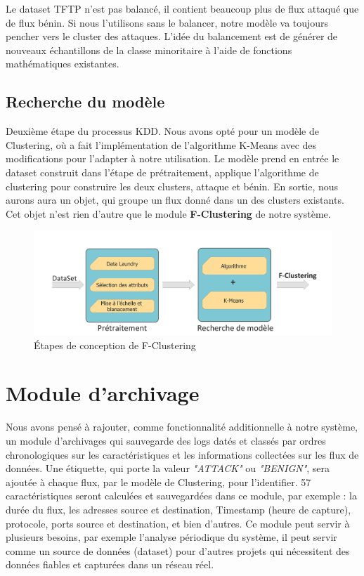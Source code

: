 Le dataset TFTP n'est pas balancé, il contient beaucoup plus de flux attaqué que de flux bénin. Si nous l'utilisons sans le balancer, notre modèle va toujours pencher vers le cluster des attaques. L'idée du balancement est de générer de nouveaux échantillons de la classe minoritaire à l'aide de fonctions mathématiques existantes.

\subsection{Recherche du modèle}
Deuxième étape du processus KDD. Nous avons opté pour un modèle de Clustering, où a fait l'implémentation de l'algorithme K-Means avec des modifications pour l'adapter à notre utilisation. Le modèle prend en entrée le dataset construit dans l'étape de prétraitement, applique l'algorithme de clustering pour construire les deux clusters, attaque et bénin. En sortie, nous aurons aura un objet, qui groupe un flux donné dans un des clusters existants. Cet objet n'est rien d'autre que le module \textbf{F-Clustering} de notre système.
\begin{figure}[h]
\centering
\includegraphics[width=\textwidth]{Figures/Diagramme2}
\decoRule
\caption{Étapes de conception de F-Clustering}
\label{fig:F-Clustering_Diagramme}
\end{figure} 

\section{Module d'archivage}
Nous avons pensé à rajouter, comme fonctionnalité additionnelle à notre système, un module d’archivages qui sauvegarde des logs datés et classés par ordres chronologiques sur les caractéristiques et les informations collectées sur les flux de données.  Une étiquette, qui porte la valeur \textit{"ATTACK"} ou \textit{"BENIGN"}, sera ajoutée à chaque flux, par le modèle de Clustering, pour l'identifier. 57 caractéristiques seront calculées et sauvegardées dans ce module, par exemple : la durée du flux, les adresses source et destination, Timestamp (heure de capture), protocole, ports source et destination, et bien d'autres. Ce module peut servir à plusieurs besoins, par exemple l'analyse périodique du système, il peut servir comme un source de données (dataset) pour d'autres projets qui nécessitent des données fiables et capturées dans un réseau réel. 

